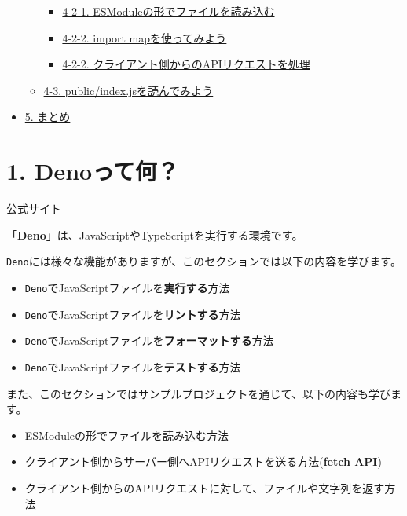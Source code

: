 \begin{itemize}
\begin{itemize}
    \begin{itemize}
    \tightlist
    \item
      \hyperref[4-2-1-esmoduleux306eux5f62ux3067ux30d5ux30a1ux30a4ux30ebux3092ux8aadux307fux8fbcux3080]{4-2-1.
      ESModuleの形でファイルを読み込む}
    \item
      \hyperref[4-2-2-import-mapux3092ux4f7fux3063ux3066ux307fux3088ux3046]{4-2-2.
      import mapを使ってみよう}
    \item
      \hyperref[4-2-2-ux30afux30e9ux30a4ux30a2ux30f3ux30c8ux5074ux304bux3089ux306eapiux30eaux30afux30a8ux30b9ux30c8ux3092ux51e6ux7406]{4-2-2.
      クライアント側からのAPIリクエストを処理}
    \end{itemize}
  \item
    \hyperref[4-3-publicindexjsux3092ux8aadux3093ux3067ux307fux3088ux3046]{4-3.
    public/index.jsを読んでみよう}
  \end{itemize}
\item
  \hyperref[5-ux307eux3068ux3081]{5. まとめ}
\end{itemize}

\section{1. Denoって何？}\label{denoux3063ux3066ux4f55}

\href{https://deno.land/}{公式サイト}

「\textbf{Deno}」は、JavaScriptやTypeScriptを実行する環境です。

\texttt{Deno}には様々な機能がありますが、このセクションでは以下の内容を学びます。

\begin{itemize}
\item
  \texttt{Deno}でJavaScriptファイルを\textbf{実行する}方法
\item
  \texttt{Deno}でJavaScriptファイルを\textbf{リントする}方法
\item
  \texttt{Deno}でJavaScriptファイルを\textbf{フォーマットする}方法
\item
  \texttt{Deno}でJavaScriptファイルを\textbf{テストする}方法
\end{itemize}

また、このセクションではサンプルプロジェクトを通じて、以下の内容も学びます。

\begin{itemize}
\item
  ESModuleの形でファイルを読み込む方法
\item
  クライアント側からサーバー側へAPIリクエストを送る方法(\textbf{fetch
  API})
\item
  クライアント側からのAPIリクエストに対して、ファイルや文字列を返す方法
\end{itemize}

